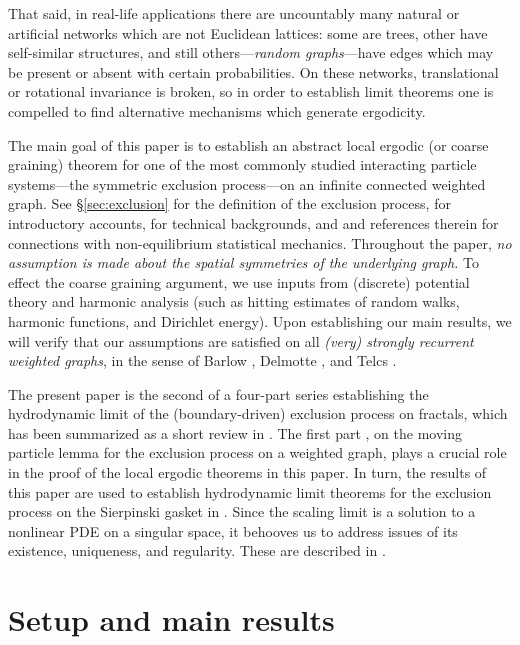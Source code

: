 \documentclass[11pt]{amsart}
\theoremstyle{plain}
\theoremstyle{definition}
\theoremstyle{remark}
\begin{document}
That said, in real-life applications there are uncountably many natural or artificial networks which are not Euclidean lattices: some are trees, other have self-similar structures, and still others---\emph{random graphs}---have edges which may be present or absent with certain probabilities. On these networks, translational or rotational invariance is broken, so in order to establish limit theorems one is compelled to find alternative mechanisms which generate ergodicity.

The main goal of this paper is to establish an abstract local ergodic (or coarse graining) theorem for one of the most commonly studied interacting particle systems---the symmetric exclusion process---on an infinite connected weighted graph. See \S\ref{sec:exclusion} for the definition of the exclusion process, \cite{AldousFill, Spitzer, IPSStFlour} for introductory accounts, \cite{KipnisLandim, LiggettBook, Spohn} for technical backgrounds, and \cite{ABDS13, BDGJL15} and references therein for connections with non-equilibrium statistical mechanics. Throughout the paper, \emph{no assumption is made about the spatial symmetries of the underlying graph.} To effect the coarse graining argument, we use inputs from (discrete) potential theory and harmonic analysis (such as hitting estimates of random walks, harmonic functions, and Dirichlet energy). Upon establishing our main results, we will verify that our assumptions are satisfied on all \emph{(very) strongly recurrent weighted graphs}, in the sense of Barlow \cite{BarlowValues, BCK05}, Delmotte \cite{Delmotte}, and Telcs \cites{Telcs01, Telcs01_2}.

The present paper is the second of a four-part series establishing the hydrodynamic limit of the (boundary-driven) exclusion process on fractals, which has been summarized as a short review in \cite{SSEPreview}. The first part \cite{ChenMPL}, on the moving particle lemma for the exclusion process on a weighted graph, plays a crucial role in the proof of the local ergodic theorems in this paper. In turn, the results of this paper are used to establish hydrodynamic limit theorems for the exclusion process on the Sierpinski gasket in \cite{ChenTeplyaevSGHydro}. Since the scaling limit is a solution to a nonlinear PDE on a singular space, it behooves us to address issues of its existence, uniqueness, and regularity. These are described in \cite{CHTPDE}.

\section{Setup and main results} \label{sec:main}
\end{document}

